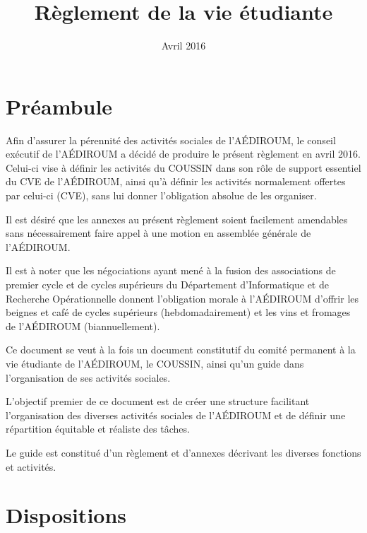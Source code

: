 \documentclass{aediroum}
\title{Règlement de la vie étudiante}
\date{Avril 2016}
\begin{document}
\maketitle

\section{Préambule}
Afin d'assurer la pérennité des activités sociales de l'AÉDIROUM, le conseil exécutif de l'AÉDIROUM a décidé de produire le présent règlement en avril 2016. Celui-ci vise à définir les activités du COUSSIN dans son rôle de support essentiel du CVE de l'AÉDIROUM, ainsi qu'à définir les activités normalement offertes par celui-ci (CVE), sans lui donner l'obligation absolue de les organiser.

Il est désiré que les annexes au présent règlement soient facilement amendables sans nécessairement faire appel à une motion en assemblée générale de l'AÉDIROUM.

Il est à noter que les négociations ayant mené à la fusion des associations de premier cycle et de cycles supérieurs du Département d'Informatique et de Recherche Opérationnelle donnent l'obligation morale à l'AÉDIROUM d'offrir les beignes et café de cycles supérieurs (hebdomadairement) et les vins et fromages de l'AÉDIROUM (biannuellement).

Ce document se veut à la fois un document constitutif du comité permanent à la vie étudiante de l'AÉDIROUM, le COUSSIN, ainsi qu'un guide dans l'organisation de ses activités sociales.

L'objectif premier de ce document est de créer une structure facilitant l'organisation des diverses activités sociales de l'AÉDIROUM et de définir une répartition équitable et réaliste des tâches.

Le guide est constitué d'un règlement et d'annexes décrivant les diverses fonctions et activités.

\section{Dispositions}
\end{document}

